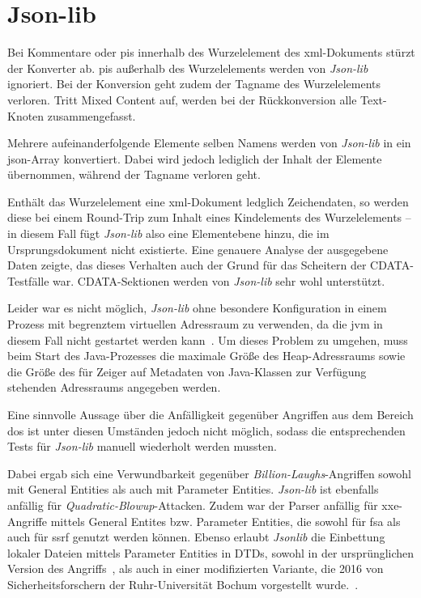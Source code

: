 \section{Json-lib}
\label{sec:jsonlib}

Bei Kommentare oder \glspl{pi} innerhalb des Wurzelelement des \acrshort{xml}-Dokuments stürzt der Konverter ab. \glspl{pi} außerhalb des Wurzelelements werden von \emph{Json-lib} ignoriert. Bei der Konversion geht zudem der Tagname des Wurzelelements verloren. Tritt Mixed Content auf, werden bei der Rückkonversion alle Text-Knoten zusammengefasst.

Mehrere aufeinanderfolgende Elemente selben Namens werden von \emph{Json-lib} in ein \acrshort{json}-Array konvertiert. Dabei wird jedoch lediglich der Inhalt der Elemente übernommen, während der Tagname verloren geht.

Enthält das Wurzelelement eine \acrshort{xml}-Dokument ledglich Zeichendaten, so werden diese bei einem Round-Trip zum Inhalt eines Kindelements des Wurzelelements -- in diesem Fall fügt \emph{Json-lib} also eine Elementebene hinzu, die im Ursprungsdokument nicht existierte. Eine genauere Analyse der ausgegebene Daten zeigte, das dieses Verhalten auch der Grund für das Scheitern der CDATA-Testfälle war. CDATA-Sektionen werden von \emph{Json-lib} sehr wohl unterstützt.

Leider war es nicht möglich, \emph{Json-lib} ohne besondere Konfiguration in einem Prozess mit begrenztem virtuellen Adressraum zu verwenden, da die \acrfull{jvm} in diesem Fall nicht gestartet werden kann~\cite{jvmmemlimit}. Um dieses Problem zu umgehen, muss beim Start des Java-Prozesses die maximale Größe des Heap-Adressraums sowie die Größe des für Zeiger auf Metadaten von Java-Klassen zur Verfügung stehenden Adressraums angegeben werden.

Eine sinnvolle Aussage über die Anfälligkeit gegenüber Angriffen aus dem Bereich \acrlong{dos} ist unter diesen Umständen jedoch nicht möglich, sodass die entsprechenden Tests für \emph{Json-lib} manuell wiederholt werden mussten.

Dabei ergab sich eine Verwundbarkeit gegenüber \emph{Billion-Laughs}-Angriffen sowohl mit General Entities als auch mit Parameter Entities. \emph{Json-lib} ist ebenfalls anfällig für \emph{Quadratic-Blowup}-Attacken. Zudem war der Parser anfällig für \acrshort{xxe}-Angriffe mittels General Entites bzw. Parameter Entities, die sowohl für \acrlong{fsa} als auch für \acrlong{ssrf} genutzt werden können.
Ebenso erlaubt \emph{Jsonlib} die Einbettung lokaler Dateien mittels Parameter Entities in DTDs, sowohl in der ursprünglichen Version des Angriffs~\cite[S.~10]{morgan2014xml}, als auch in einer modifizierten Variante, die 2016 von Sicherheitsforschern der Ruhr-Universität Bochum vorgestellt wurde.~\cite[Abschn.~5.2]{spaeth2016sok}.


